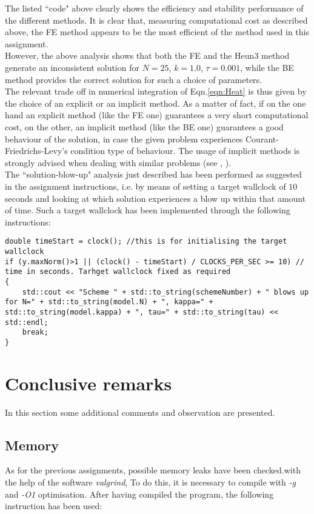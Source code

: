 \documentclass[11pt]{article}
\theoremstyle{theorem}
\theoremstyle{definition}
\begin{document}
The listed ``code" above clearly shows the efficiency and stability performance of the different methods. It is clear that, measuring computational cost as described above, the FE method appears to be the most efficient of the method used in this assignment.\\
However, the above analysis shows that both the FE and the Heun3 method generate an inconsistent solution for $N=25$, $k=1.0$, $\tau=0.001$, while the BE method provides the correct solution for such a choice of parameters.\\
The relevant trade off in numerical integration of Eqn.\eqref{eqn:Heat} is thus given by the choice of an explicit or an implicit method. As a matter of fact, if on the one hand an explicit method (like the FE one) guarantees a very short computational cost, on the other, an implicit method (like the BE one) guarantees a good behaviour of the solution, in case the given problem experiences Courant-Friedrichs-Levy's condition type of behaviour. The usage of implicit methods is strongly advised when dealing with similar problems (see \cite{lec-notes}, \cite{numerical-math}).\\
The ``solution-blow-up" analysis just described has been performed as suggested in the assignment instructions, i.e. by means of setting a target wallclock of $10$ seconds and looking at which solution experiences a blow up within that amount of time. Such a target wallclock has been implemented through the following instructions:

\begin{lstlisting}
double timeStart = clock(); //this is for initialising the target wallclock
if (y.maxNorm()>1 || (clock() - timeStart) / CLOCKS_PER_SEC >= 10) // time in seconds. Tarhget wallclock fixed as required
{
	std::cout << "Scheme " + std::to_string(schemeNumber) + " blows up for N=" + std::to_string(model.N) + ", kappa=" + std::to_string(model.kappa) + ", tau=" + std::to_string(tau) << std::endl;
	break;
}
\end{lstlisting}




\section{Conclusive remarks}
In this section some additional comments and observation are presented.

\subsection{Memory}
As for the previous assignments, possible memory leaks have been checked.with the help of the software \emph{valgrind}, To do this, it is necessary to compile with \emph{-g} and \emph{-O1} optimisation. After having compiled the program, the following instruction has been used:
\end{document}
